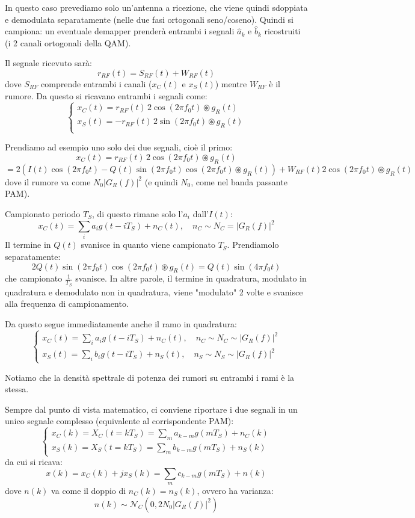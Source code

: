 \documentclass[a4paper,11pt]{article}
\begin{document}
In questo caso prevediamo solo un'antenna a ricezione, che viene quindi sdoppiata e demodulata separatamente (nelle due fasi ortogonali seno/coseno). Quindi si campiona: un eventuale demapper prenderà entrambi i segnali $\hat{a}_k$ e $\hat{b}_k$ ricostruiti (i 2 canali ortogonali della QAM). 

Il segnale ricevuto sarà:
$$
r_{RF}(t) = S_{RF}(t) + W_{RF}(t)
$$
dove $S_{RF}$ comprende entrambi i canali ($x_C(t)$ e $x_S(t)$) mentre $W_{RF}$ è il rumore.
Da questo si ricavano entrambi i segnali come:
$$
\begin{cases}
	x_C(t) = r_{RF}(t) \, 2 \cos(2 \pi f_0 t) \circledast g_R(t) \\
	x_S(t) = - r_{RF}(t) \, 2 \sin(2 \pi f_0 t) \circledast g_R(t) \\
\end{cases}
$$

Prendiamo ad esempio uno solo dei due segnali, cioè il primo:
$$
x_C(t) = r_{RF}(t) \, 2 \cos(2 \pi f_0 t) \circledast g_R(t)
$$
$$
= 2 \left( I(t) \cos(2 \pi f_0 t) - Q(t) \sin(2 \pi f_0 t) \cos(2 \pi f_0 t) \circledast g_R(t) \right) + W_{RF}(t) 2 \cos (2 \pi f_0 t) \circledast g_R(t)
$$
dove il rumore va come $N_0 |G_R(f)|^2$ (e quindi $N_0$, come nel banda passante PAM).

Campionato periodo $T_S$, di questo rimane solo l'$a_i$ dall'$I(t)$:
$$
x_C(t) = \sum_i a_i g(t - i T_S) + n_C(t), \quad n_C \sim N_C = | G_R(f) |^2
$$
Il termine in $Q(t)$ svanisce in quanto viene campionato $T_S$. Prendiamolo separatamente:
$$
2 Q(t) \sin (2 \pi f_0 t) \cos (2 \pi f_0 t) \circledast g_R(t) = Q(t) \sin(4 \pi f_0 t)
$$
che campionato $\frac{1}{T_S}$ svanisce. In altre parole, il termine in quadratura, modulato in quadratura e demodulato non in quadratura, viene "modulato" 2 volte e svanisce alla frequenza di campionamento.

Da questo segue immediatamente anche il ramo in quadratura:
$$
\begin{cases}
	x_C(t) = \sum_i a_i g(t - i T_S) + n_C(t), \quad n_C \sim N_C \sim | G_R(f) |^2 \\
	x_S(t) = \sum_i b_i g(t - i T_S) + n_S(t), \quad n_S \sim N_S \sim | G_R(f) |^2
\end{cases}
$$

Notiamo che la densità spettrale di potenza dei rumori su entrambi i rami è la stessa.

Sempre dal punto di vista matematico, ci conviene riportare i due segnali in un unico segnale complesso (equivalente al corrispondente PAM):
$$
\begin{cases}
	x_C(k) = X_C(t = k T_S) = \sum_m a_{k - m} g(m T_S) + n_C(k) \\
	x_S(k) = X_S(t = k T_S) = \sum_m b_{k - m} g(m T_S) + n_S(k) 
\end{cases}
$$
da cui si ricava:
$$
x(k) = x_C(k) + j x_S(k) = \sum_m c_{k - m} g(m T_S) + n(k) 
$$
dove $n(k)$ va come il doppio di $n_C(k) = n_S(k)$, ovvero ha varianza:
$$
n(k) \sim \mathcal{N}_C(0, 2 N_0 |G_R(f)|^2)
$$
\end{document}
